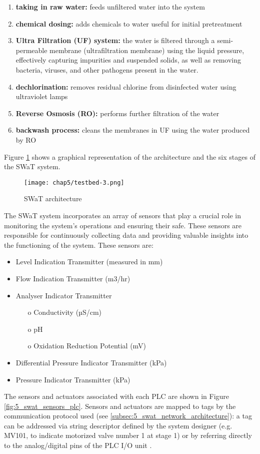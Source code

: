 \begin{enumerate}
	\item \textbf{taking in raw water:} feeds unfiltered water into the system
	\item \textbf{chemical dosing:} adds chemicals to water useful for initial pretreatment
	\item \textbf{Ultra Filtration (UF) system:} the water is filtered through a semi-permeable membrane (ultrafiltration membrane) using the liquid pressure, effectively capturing impurities and suspended solids, as well as removing bacteria, viruses, and other pathogens present in the water.
	\item \textbf{dechlorination:} removes residual chlorine from disinfected water using ultraviolet lamps
	\item \textbf{Reverse Osmosis (RO):} performs further filtration of the water
	\item \textbf{backwash process:} cleans the membranes in UF using the water produced by RO
\end{enumerate}
Figure \ref{fig:5_swat_architecture_1} shows a graphical representation of the architecture and the six stages of the SWaT system.

\begin{figure}[ht]
	\centering
	\texttt{[image: chap5/testbed-3.png]}
	\caption{SWaT architecture}
	\label{fig:5_swat_architecture_1}
\end{figure}

\bigskip
The SWaT system incorporates an array of sensors that play a crucial role in monitoring the system's operations and ensuring their safe. These sensors are responsible for continuously collecting data and providing valuable insights into the functioning of the system. These sensors are:

\begin{itemize}
	\item Level Indication Transmitter (measured in mm)
	\item Flow Indication Transmitter (m3/hr)
	\item Analyser Indicator Transmitter
	\begin{itemize}
		\item[o] Conductivity (µS/cm)
		\item[o] pH
		\item[o] Oxidation Reduction Potential (mV)
	\end{itemize}
	\item Differential Pressure Indicator Transmitter (kPa)
	\item Pressure Indicator Transmitter (kPa)
\end{itemize}
The sensors and actuators associated with each PLC are shown in Figure \ref{fig:5_swat_sensors_plc}. \newline
Sensors and actuators are mapped to tags by the communication protocol used (see \ref{subsec:5_swat_network_architecture}): a tag can be addressed via string descriptor defined by the system designer (e.g. MV101, to indicate motorized valve number 1 at stage 1) or by referring directly to the analog/digital pins of the PLC I/O unit \cite{swat_tippenhauer}.

